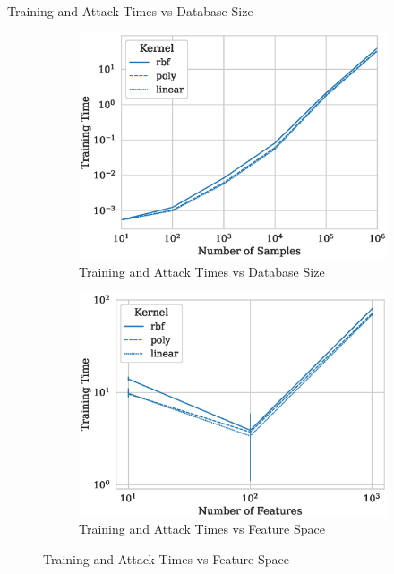 \documentclass{beamer}
\begin{document}
\begin{frame}{Training and Attack Times vs Database Size}
  \begin{figure}
    \centering
    \begin{subfigure}{.45\textwidth}
      \centering
      \includegraphics[width=\textwidth]{./generated/train_time_vs_samples.eps}
      \caption{Training and Attack Times vs Database Size}
    \end{subfigure}
    \hfill
    \begin{subfigure}{.45\textwidth}
      \centering
      \includegraphics[width=\textwidth]{./generated/train_time_vs_features.eps}
      \caption{Training and Attack Times vs Feature Space}
    \end{subfigure}
  \end{figure}
\end{frame}
\end{document}
